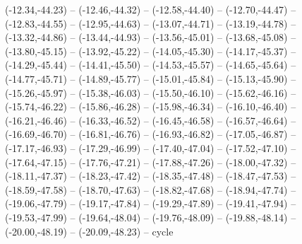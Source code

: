 {  (-12.34,-44.23) -- (-12.46,-44.32) -- (-12.58,-44.40) -- (-12.70,-44.47) -- (-12.83,-44.55) -- (-12.95,-44.63) -- (-13.07,-44.71) --
  (-13.19,-44.78) -- (-13.32,-44.86) -- (-13.44,-44.93) -- (-13.56,-45.01) -- (-13.68,-45.08) -- (-13.80,-45.15) -- (-13.92,-45.22) --
  (-14.05,-45.30) -- (-14.17,-45.37) -- (-14.29,-45.44) -- (-14.41,-45.50) -- (-14.53,-45.57) -- (-14.65,-45.64) -- (-14.77,-45.71) --
  (-14.89,-45.77) -- (-15.01,-45.84) -- (-15.13,-45.90) -- (-15.26,-45.97) -- (-15.38,-46.03) -- (-15.50,-46.10) -- (-15.62,-46.16) --
  (-15.74,-46.22) -- (-15.86,-46.28) -- (-15.98,-46.34) -- (-16.10,-46.40) -- (-16.21,-46.46) -- (-16.33,-46.52) -- (-16.45,-46.58) --
  (-16.57,-46.64) -- (-16.69,-46.70) -- (-16.81,-46.76) -- (-16.93,-46.82) -- (-17.05,-46.87) -- (-17.17,-46.93) -- (-17.29,-46.99) --
  (-17.40,-47.04) -- (-17.52,-47.10) -- (-17.64,-47.15) -- (-17.76,-47.21) -- (-17.88,-47.26) -- (-18.00,-47.32) -- (-18.11,-47.37) --
  (-18.23,-47.42) -- (-18.35,-47.48) -- (-18.47,-47.53) -- (-18.59,-47.58) -- (-18.70,-47.63) -- (-18.82,-47.68) -- (-18.94,-47.74) --
  (-19.06,-47.79) -- (-19.17,-47.84) -- (-19.29,-47.89) -- (-19.41,-47.94) -- (-19.53,-47.99) -- (-19.64,-48.04) -- (-19.76,-48.09) --
  (-19.88,-48.14) -- (-20.00,-48.19) -- (-20.09,-48.23) -- cycle}
